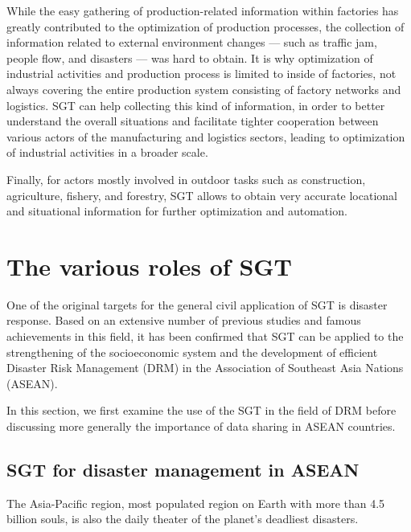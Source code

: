 \vspace{0.4 cm}

While the easy gathering of production-related information within factories has greatly contributed to the optimization of production processes, the collection of information related to external environment changes --- such as traffic jam, people flow, and disasters --- was hard to obtain. It is why optimization of industrial activities and production process is limited to inside of factories, not always covering the entire production system consisting of factory networks and logistics. SGT can help collecting this kind of information, in order to better understand the overall situations and facilitate tighter cooperation between various actors of the manufacturing and logistics sectors, leading to optimization of industrial activities in a broader scale. 

\vspace{0.4 cm}

Finally, for actors mostly involved in outdoor tasks such as construction, agriculture, fishery, and forestry, SGT allows to obtain very accurate locational and situational information for further optimization and automation.

\section{The various roles of SGT}

One of the original targets for the general civil application of SGT is disaster response. Based on an extensive number of previous studies and famous achievements in this field, it has been confirmed that SGT can be applied to the strengthening of the socioeconomic system and the development of efficient Disaster Risk Management (DRM) in the Association of Southeast Asia Nations (ASEAN).

\vspace{0.4 cm}

In this section, we first examine the use of the SGT in the field of DRM before discussing more generally the importance of data sharing in ASEAN countries.

\subsection{SGT for disaster management in ASEAN}

\tab The Asia-Pacific region, most populated region on Earth with more than 4.5 billion souls, is also the daily theater of the planet's deadliest disasters. 

